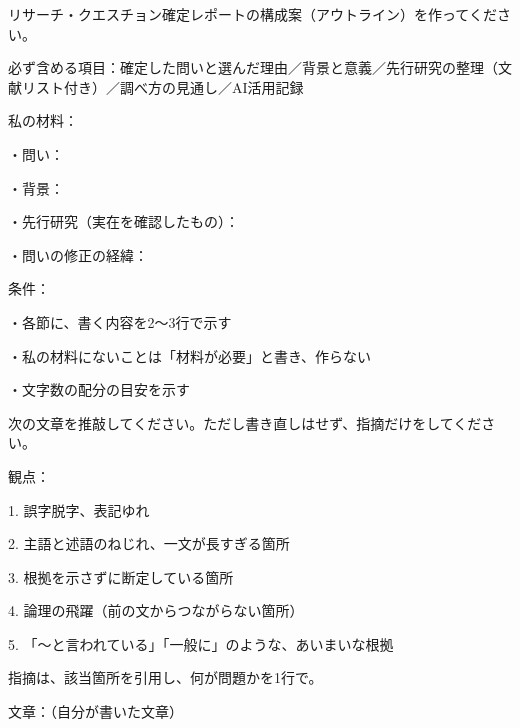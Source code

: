\begin{promptbox}
リサーチ・クエスチョン確定レポートの構成案（アウトライン）を作ってください。

必ず含める項目：確定した問いと選んだ理由／背景と意義／先行研究の整理（文献リスト付き）／調べ方の見通し／AI活用記録

私の材料：

・問い：

・背景：

・先行研究（実在を確認したもの）：

・問いの修正の経緯：

条件：

・各節に、書く内容を2〜3行で示す

・私の材料にないことは「材料が必要」と書き、作らない

・文字数の配分の目安を示す
\end{promptbox}

\begin{promptbox}
次の文章を推敲してください。ただし書き直しはせず、指摘だけをしてください。

観点：

1. 誤字脱字、表記ゆれ

2. 主語と述語のねじれ、一文が長すぎる箇所

3. 根拠を示さずに断定している箇所

4. 論理の飛躍（前の文からつながらない箇所）

5. 「〜と言われている」「一般に」のような、あいまいな根拠

指摘は、該当箇所を引用し、何が問題かを1行で。

文章：（自分が書いた文章）
\end{promptbox}

